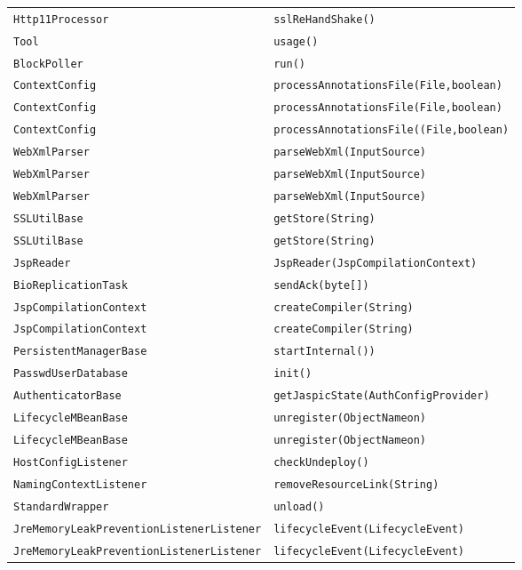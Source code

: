 \begin{center}
\begin{longtable}{ll}
\lstinline/Http11Processor/&{\lstinline/sslReHandShake()/}\\
\lstinline/Tool/&{\lstinline/usage()/}\\
\lstinline/BlockPoller/&{\lstinline/run()/}\\
\lstinline/ContextConfig/&{\lstinline/processAnnotationsFile(File,boolean)/}\\
\lstinline/ContextConfig/&{\lstinline/processAnnotationsFile(File,boolean)/}\\
\lstinline/ContextConfig/&{\lstinline/processAnnotationsFile((File,boolean)/}\\
\lstinline/WebXmlParser/&{\lstinline/parseWebXml(InputSource)/}\\
\lstinline/WebXmlParser/&{\lstinline/parseWebXml(InputSource)/}\\
\lstinline/WebXmlParser/&{\lstinline/parseWebXml(InputSource)/}\\
\lstinline/SSLUtilBase/&{\lstinline/getStore(String)/}\\
\lstinline/SSLUtilBase/&{\lstinline/getStore(String)/}\\
\lstinline/JspReader/&{\lstinline/JspReader(JspCompilationContext)/}\\
\lstinline/BioReplicationTask/&{\lstinline/sendAck(byte[])/}\\
\lstinline/JspCompilationContext/&{\lstinline/createCompiler(String)/}\\
\lstinline/JspCompilationContext/&{\lstinline/createCompiler(String)/}\\
\lstinline/PersistentManagerBase/&{\lstinline/startInternal())/}\\
\lstinline/PasswdUserDatabase/&{\lstinline/init()/}\\
\lstinline/AuthenticatorBase/&{\lstinline/getJaspicState(AuthConfigProvider)/}\\
\lstinline/LifecycleMBeanBase/&{\lstinline/unregister(ObjectNameon)/}\\
\lstinline/LifecycleMBeanBase/&{\lstinline/unregister(ObjectNameon)/}\\
\lstinline/HostConfigListener/&{\lstinline/checkUndeploy()/}\\
\lstinline/NamingContextListener/&{\lstinline/removeResourceLink(String)/}\\
\lstinline/StandardWrapper/&{\lstinline/unload()/}\\
\lstinline/JreMemoryLeakPreventionListenerListener/&{\lstinline/lifecycleEvent(LifecycleEvent)/}\\
\lstinline/JreMemoryLeakPreventionListenerListener/&{\lstinline/lifecycleEvent(LifecycleEvent)/}\\

\end{longtable}
\end{center}
